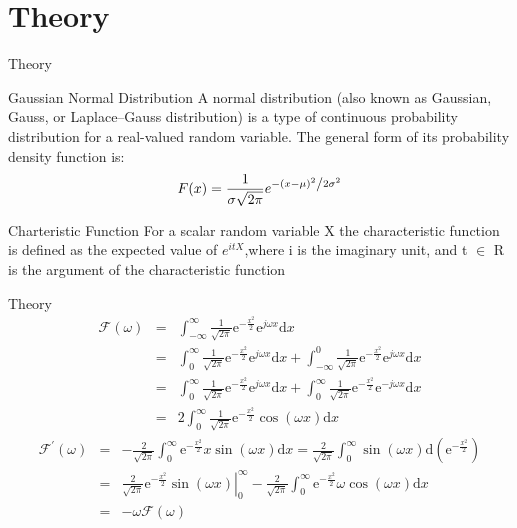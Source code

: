 \documentclass{beamer}
\begin{document}
\section{Theory}
\begin{frame}{Theory}
\begin{block}{Gaussian Normal Distribution }
 A normal distribution (also known as Gaussian, Gauss, or Laplace–Gauss distribution) is a type of continuous probability distribution for a real-valued random variable. The general form of its probability density function is:
 \begin{align}
F(x) = \frac{1}{{\sigma \sqrt {2\pi } }}e^{{{ - \left( {x - \mu } \right)^2 } \mathord{\left/ {\vphantom {{ - \left( {x - \mu } \right)^2 } {2\sigma ^2 }}} \right. \kern-\nulldelimiterspace} {2\sigma ^2 }}}
 \end{align}
\end{block}
\begin{block}{Charteristic Function}
For a scalar random variable X the characteristic function is defined as the expected value of $e^{itX}$,where i is the imaginary unit, and t $\in$ R is the argument of the characteristic function
\end{block}
\end{frame}
\begin{frame}{Theory}
\begin{eqnarray*}
  \mathcal{F}(\omega) &=&\int_{-\infty}^\infty \frac{1}{\sqrt{2\pi}} \mathrm{e}^{-\frac{x^2}{2}} \mathrm{e}^{j \omega x} \mathrm{d} x \\ &=& \int_{0}^\infty \frac{1}{\sqrt{2\pi}} \mathrm{e}^{-\frac{x^2}{2}} \mathrm{e}^{j \omega x} \mathrm{d} x + \int_{-\infty}^0 \frac{1}{\sqrt{2\pi}} \mathrm{e}^{-\frac{x^2}{2}} \mathrm{e}^{j \omega x} \mathrm{d} x \\
   &=& \int_{0}^\infty \frac{1}{\sqrt{2\pi}} \mathrm{e}^{-\frac{x^2}{2}} \mathrm{e}^{j \omega x} \mathrm{d} x + \int_{0}^{\infty} \frac{1}{\sqrt{2\pi}} \mathrm{e}^{-\frac{x^2}{2}} \mathrm{e}^{-j \omega x} \mathrm{d} x \\
   &=&  2 \int_{0}^\infty \frac{1}{\sqrt{2\pi}} \mathrm{e}^{-\frac{x^2}{2}} \cos(\omega x) \mathrm{d} x
  \end{eqnarray*}
  \begin{eqnarray*}
   \mathcal{F}^\prime(\omega) &=& -\frac{2}{\sqrt{2\pi}} \int_0^\infty \mathrm{e}^{-\frac{x^2}{2}} x \sin(\omega x) \mathrm{d} x = \frac{2}{\sqrt{2\pi}} \int_0^\infty \sin(\omega x) \mathrm{d} \left( \mathrm{e}^{-\frac{x^2}{2}} \right) \\
   &=& \frac{2}{\sqrt{2\pi}} \left. \mathrm{e}^{-\frac{x^2}{2}} \sin(\omega x) \right|_0^\infty - \frac{2}{\sqrt{2\pi}} \int_0^\infty \mathrm{e}^{-\frac{x^2}{2}} \omega \cos(\omega x) \mathrm{d} x \\ 
    &=& - \omega \mathcal{F}(\omega) 
  \end{eqnarray*}
\end{frame}
\end{document}
